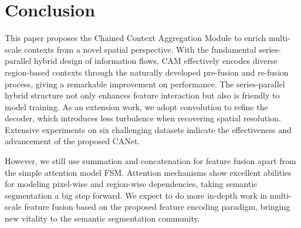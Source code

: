 \documentclass[journal]{IEEEtran}
\begin{document}
\begin{table}
\caption{Results on GATECH dataset}
\begin{center}
\end{center}
\label{table:gatech}
\end{table}

\section{Conclusion}
\label{section:conclusion}
This paper proposes the Chained Context Aggregation Module to enrich multi-scale contexts from a novel spatial perspective. With the fundamental series-parallel hybrid design of information flows, CAM effectively encodes diverse region-based contexts through the naturally developed pre-fusion and re-fusion process, giving a remarkable improvement on performance. The series-parallel hybrid structure not only enhances feature interaction but also is friendly to model training. As an extension work, we adopt  convolution to refine the decoder, which introduces less turbulence when recovering spatial resolution. Extensive experiments on six challenging datasets indicate the effectiveness and advancement of the proposed CANet. 

However, we still use summation and concatenation for feature fusion apart from the simple attention model FSM. Attention mechanisms show excellent abilities for modeling pixel-wise and region-wise dependencies, taking semantic segmentation a big step forward. We expect to do more in-depth work in multi-scale feature fusion based on the proposed feature encoding paradigm, bringing new vitality to the semantic segmentation community.














\ifCLASSOPTIONcaptionsoff
  \newpage
\fi









\end{document}
